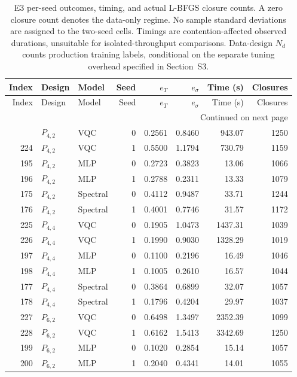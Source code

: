 \documentclass[11pt]{article}
\begin{document}
\begingroup\scriptsize
\setlength{\tabcolsep}{3pt}
\begin{longtable}{rllrrrrr}
\caption{E3 per-seed outcomes, timing, and actual L-BFGS closure counts.
A zero closure count denotes the data-only regime. No sample standard
deviations are assigned to the two-seed cells. Timings are
contention-affected observed durations, unsuitable for isolated-throughput
comparisons. Data-design $N_d$ counts production training labels,
conditional on the separate tuning overhead specified in Section~S3.}
\label{tab:e3-seeds}\\
\toprule
Index & Design & Model & Seed & $e_T$ & $e_\sigma$ & Time (s) & Closures \\
\midrule\endfirsthead
\toprule
Index & Design & Model & Seed & $e_T$ & $e_\sigma$ & Time (s) & Closures \\
\midrule\endhead
\midrule\multicolumn{8}{r}{Continued on next page}\\\endfoot
\bottomrule\endlastfoot
223 & $P_{4,2}$ & VQC & 0 & 0.2561 & 0.8460 & 943.07 & 1250 \\
224 & $P_{4,2}$ & VQC & 1 & 0.5500 & 1.1794 & 730.79 & 1159 \\
195 & $P_{4,2}$ & MLP & 0 & 0.2723 & 0.3823 & 13.06 & 1066 \\
196 & $P_{4,2}$ & MLP & 1 & 0.2788 & 0.2311 & 13.33 & 1079 \\
175 & $P_{4,2}$ & Spectral & 0 & 0.4112 & 0.9487 & 33.71 & 1244 \\
176 & $P_{4,2}$ & Spectral & 1 & 0.4001 & 0.7746 & 31.57 & 1172 \\
225 & $P_{4,4}$ & VQC & 0 & 0.1905 & 1.0473 & 1437.31 & 1039 \\
226 & $P_{4,4}$ & VQC & 1 & 0.1990 & 0.9030 & 1328.29 & 1019 \\
197 & $P_{4,4}$ & MLP & 0 & 0.1100 & 0.2196 & 16.49 & 1046 \\
198 & $P_{4,4}$ & MLP & 1 & 0.1005 & 0.2610 & 16.57 & 1044 \\
177 & $P_{4,4}$ & Spectral & 0 & 0.3864 & 0.6899 & 32.07 & 1057 \\
178 & $P_{4,4}$ & Spectral & 1 & 0.1796 & 0.4204 & 29.97 & 1037 \\
227 & $P_{6,2}$ & VQC & 0 & 0.6498 & 1.3497 & 2352.39 & 1099 \\
228 & $P_{6,2}$ & VQC & 1 & 0.6162 & 1.5413 & 3342.69 & 1250 \\
199 & $P_{6,2}$ & MLP & 0 & 0.1020 & 0.2854 & 15.14 & 1057 \\
200 & $P_{6,2}$ & MLP & 1 & 0.2040 & 0.4341 & 14.01 & 1055 \\

\end{longtable}
\end{document}
